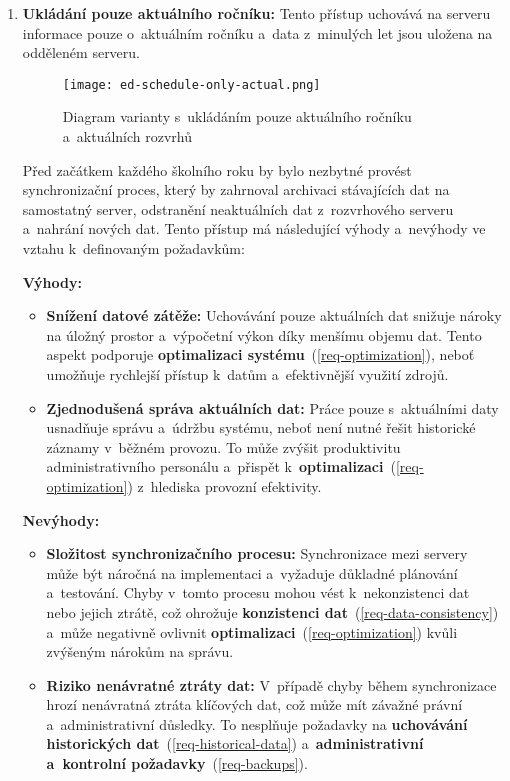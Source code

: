 \begin{enumerate}
    \item \textbf{Ukládání pouze aktuálního ročníku:} Tento přístup uchovává na serveru informace pouze o~aktuálním ročníku a~data z~minulých let jsou uložena na odděleném serveru.

    \begin{figure}[H]
        \centering
        \texttt{[image: ed-schedule-only-actual.png]}
        \caption{Diagram varianty s~ukládáním pouze aktuálního ročníku a~aktuálních rozvrhů}
        \label{fig:ed-schedule-only-actual}
    \end{figure}
    
    Před začátkem každého školního roku by bylo nezbytné provést synchronizační proces, který by zahrnoval archivaci stávajících dat na samostatný server, odstranění neaktuálních dat z~rozvrhového serveru a~nahrání nových dat. Tento přístup má následující výhody a~nevýhody ve vztahu k~definovaným požadavkům:

    \textbf{Výhody:}
    \begin{itemize} 
        \item \textbf{Snížení datové zátěže:} Uchovávání pouze aktuálních dat snižuje nároky na úložný prostor a~výpočetní výkon díky menšímu objemu dat. Tento aspekt podporuje \textbf{optimalizaci systému}~(\ref{req-optimization}), neboť umožňuje rychlejší přístup k~datům a~efektivnější využití zdrojů.

        \item \textbf{Zjednodušená správa aktuálních dat:} Práce pouze s~aktuálními daty usnadňuje správu a~údržbu systému, neboť není nutné řešit historické záznamy v~běžném provozu. To může zvýšit produktivitu administrativního personálu a~přispět k~\textbf{optimalizaci}~(\ref{req-optimization}) z~hlediska provozní efektivity.
    \end{itemize}

    \textbf{Nevýhody:}
    \begin{itemize} 
        \item \textbf{Složitost synchronizačního procesu:} Synchronizace mezi servery může být náročná na implementaci a~vyžaduje důkladné plánování a~testování. Chyby v~tomto procesu mohou vést k~nekonzistenci dat nebo jejich ztrátě, což ohrožuje \textbf{konzistenci dat}~(\ref{req-data-consistency}) a~může negativně ovlivnit \textbf{optimalizaci}~(\ref{req-optimization}) kvůli zvýšeným nárokům na správu.

        \item \textbf{Riziko nenávratné ztráty dat:} V~případě chyby během synchronizace hrozí nenávratná ztráta klíčových dat, což může mít závažné právní a~administrativní důsledky. To nesplňuje požadavky na \textbf{uchovávání historických dat}~(\ref{req-historical-data}) a~\textbf{administrativní a~kontrolní požadavky}~(\ref{req-backups}).


\end{itemize}
\end{enumerate}
